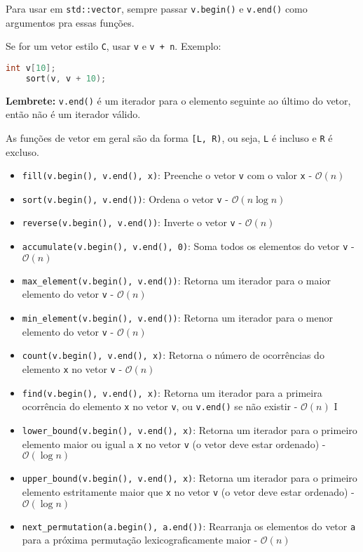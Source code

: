 Para usar em \texttt{std::vector}, sempre passar \texttt{v.begin()} e \texttt{v.end()} como argumentos pra essas funções.

Se for um vetor estilo \texttt{C}, usar \texttt{v} e \texttt{v + n}. 
Exemplo:
\begin{lstlisting}[language=C++]
    int v[10];
    sort(v, v + 10);
\end{lstlisting}

\textbf{Lembrete:} \texttt{v.end()} é um iterador para o elemento seguinte ao último do vetor, então não é um iterador válido.

As funções de vetor em geral são da forma \texttt{[L, R)}, ou seja, \texttt{L} é incluso e \texttt{R} é excluso.

\begin{itemize}
    \item \texttt{fill(v.begin(), v.end(), x)}: Preenche o vetor \texttt{v} com o valor \texttt{x} - $\mathcal{O}(n)$
    \item \texttt{sort(v.begin(), v.end())}: Ordena o vetor \texttt{v} - $\mathcal{O}(n \log n)$
    \item \texttt{reverse(v.begin(), v.end())}: Inverte o vetor \texttt{v} - $\mathcal{O}(n)$
    \item \texttt{accumulate(v.begin(), v.end(), 0)}: Soma todos os elementos do vetor \texttt{v} - $\mathcal{O}(n)$
    \item \texttt{max\_element(v.begin(), v.end())}: Retorna um iterador para o maior elemento do vetor \texttt{v} - $\mathcal{O}(n)$
    \item \texttt{min\_element(v.begin(), v.end())}: Retorna um iterador para o menor elemento do vetor \texttt{v} - $\mathcal{O}(n)$
    \item \texttt{count(v.begin(), v.end(), x)}: Retorna o número de ocorrências do elemento \texttt{x} no vetor \texttt{v} - $\mathcal{O}(n)$
    \item \texttt{find(v.begin(), v.end(), x)}: Retorna um iterador para a primeira ocorrência do elemento \texttt{x} no vetor \texttt{v}, ou \texttt{v.end()} se não existir - $\mathcal{O}(n)$
    I\item \texttt{lower\_bound(v.begin(), v.end(), x)}: Retorna um iterador para o primeiro elemento maior ou igual a \texttt{x} no vetor \texttt{v} (o vetor deve estar ordenado) - $\mathcal{O}(\log n)$
    \item \texttt{upper\_bound(v.begin(), v.end(), x)}: Retorna um iterador para o primeiro elemento estritamente maior que \texttt{x} no vetor \texttt{v} (o vetor deve estar ordenado) - $\mathcal{O}(\log n)$
    \item \texttt{next\_permutation(a.begin(), a.end())}: Rearranja os elementos do vetor \texttt{a} para a próxima permutação lexicograficamente maior - $\mathcal{O}(n)$
\end{itemize}

